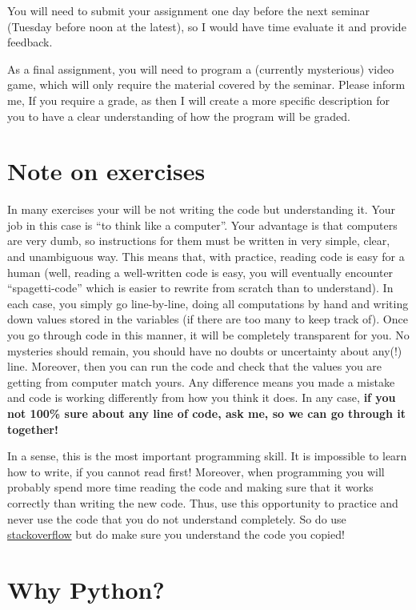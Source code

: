 \documentclass[
]{book}
\begin{document}
You will need to submit your assignment one day before the next seminar (Tuesday before noon at the latest), so I would have time evaluate it and provide feedback.

As a final assignment, you will need to program a (currently mysterious) video game, which will only require the material covered by the seminar. Please inform me, If you require a grade, as then I will create a more specific description for you to have a clear understanding of how the program will be graded.

\hypertarget{note-on-exercises}{%
\section*{Note on exercises}\label{note-on-exercises}}

In many exercises your will be not writing the code but understanding it. Your job in this case is ``to think like a computer''. Your advantage is that computers are very dumb, so instructions for them must be written in very simple, clear, and unambiguous way. This means that, with practice, reading code is easy for a human (well, reading a well-written code is easy, you will eventually encounter ``spagetti-code'' which is easier to rewrite from scratch than to understand). In each case, you simply go line-by-line, doing all computations by hand and writing down values stored in the variables (if there are too many to keep track of). Once you go through code in this manner, it will be completely transparent for you. No mysteries should remain, you should have no doubts or uncertainty about any(!) line. Moreover, then you can run the code and check that the values you are getting from computer match yours. Any difference means you made a mistake and code is working differently from how you think it does. In any case, \textbf{if you not 100\% sure about any line of code, ask me, so we can go through it together!}

In a sense, this is the most important programming skill. It is impossible to learn how to write, if you cannot read first! Moreover, when programming you will probably spend more time reading the code and making sure that it works correctly than writing the new code. Thus, use this opportunity to practice and never use the code that you do not understand completely. So do use \href{https://stackoverflow.com/}{stackoverflow} but do make sure you understand the code you copied!

\hypertarget{why-python}{%
\section*{Why Python?}\label{why-python}}
\end{document}
